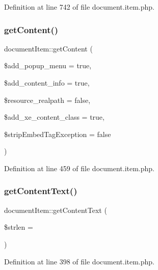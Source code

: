 Definition at line 742 of file document.\+item.\+php.

\hypertarget{classdocumentItem_ab93870c122bc952a206f3c64ced3aa9e}{}\label{classdocumentItem_ab93870c122bc952a206f3c64ced3aa9e} 
\subsubsection{\texorpdfstring{get\+Content()}{getContent()}}
{\footnotesize\ttfamily document\+Item\+::get\+Content (\begin{DoxyParamCaption}\item[{}]{\$add\+\_\+popup\+\_\+menu = {\ttfamily true},  }\item[{}]{\$add\+\_\+content\+\_\+info = {\ttfamily true},  }\item[{}]{\$resource\+\_\+realpath = {\ttfamily false},  }\item[{}]{\$add\+\_\+xe\+\_\+content\+\_\+class = {\ttfamily true},  }\item[{}]{\$strip\+Embed\+Tag\+Exception = {\ttfamily false} }\end{DoxyParamCaption})}



Definition at line 459 of file document.\+item.\+php.

\hypertarget{classdocumentItem_acdef9404e1dc50d82456fb112212e23e}{}\label{classdocumentItem_acdef9404e1dc50d82456fb112212e23e} 
\subsubsection{\texorpdfstring{get\+Content\+Text()}{getContentText()}}
{\footnotesize\ttfamily document\+Item\+::get\+Content\+Text (\begin{DoxyParamCaption}\item[{}]{\$strlen = {} }\end{DoxyParamCaption})}



Definition at line 398 of file document.\+item.\+php.

\hypertarget{classdocumentItem_adad3fafeaac19dfed4bea9e5709677d4}{}\label{classdocumentItem_adad3fafeaac19dfed4bea9e5709677d4} 
